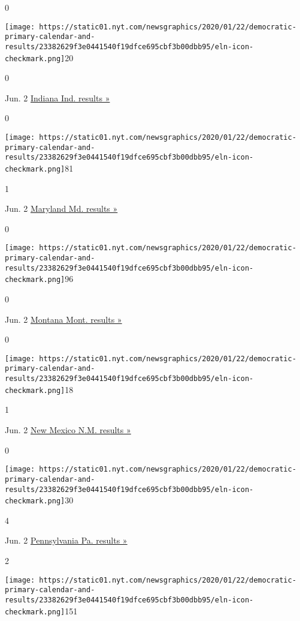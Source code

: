 0

\texttt{[image: https://static01.nyt.com/newsgraphics/2020/01/22/democratic-primary-calendar-and-results/23382629f3e0441540f19dfce695cbf3b00dbb95/eln-icon-checkmark.png]}20

0

Jun. 2
\href{https://www.nytimes.com/interactive/2020/06/02/us/elections/results-indiana-primary-elections.html}{Indiana
Ind. results »}

0

\texttt{[image: https://static01.nyt.com/newsgraphics/2020/01/22/democratic-primary-calendar-and-results/23382629f3e0441540f19dfce695cbf3b00dbb95/eln-icon-checkmark.png]}81

1

Jun. 2
\href{https://www.nytimes.com/interactive/2020/06/02/us/elections/results-maryland-primary-elections.html}{Maryland
Md. results »}

0

\texttt{[image: https://static01.nyt.com/newsgraphics/2020/01/22/democratic-primary-calendar-and-results/23382629f3e0441540f19dfce695cbf3b00dbb95/eln-icon-checkmark.png]}96

0

Jun. 2
\href{https://www.nytimes.com/interactive/2020/06/02/us/elections/results-montana-primary-elections.html}{Montana
Mont. results »}

0

\texttt{[image: https://static01.nyt.com/newsgraphics/2020/01/22/democratic-primary-calendar-and-results/23382629f3e0441540f19dfce695cbf3b00dbb95/eln-icon-checkmark.png]}18

1

Jun. 2
\href{https://www.nytimes.com/interactive/2020/06/02/us/elections/results-new-mexico-primary-elections.html}{New
Mexico N.M. results »}

0

\texttt{[image: https://static01.nyt.com/newsgraphics/2020/01/22/democratic-primary-calendar-and-results/23382629f3e0441540f19dfce695cbf3b00dbb95/eln-icon-checkmark.png]}30

4

Jun. 2
\href{https://www.nytimes.com/interactive/2020/06/02/us/elections/results-pennsylvania-primary-elections.html}{Pennsylvania
Pa. results »}

2

\texttt{[image: https://static01.nyt.com/newsgraphics/2020/01/22/democratic-primary-calendar-and-results/23382629f3e0441540f19dfce695cbf3b00dbb95/eln-icon-checkmark.png]}151

